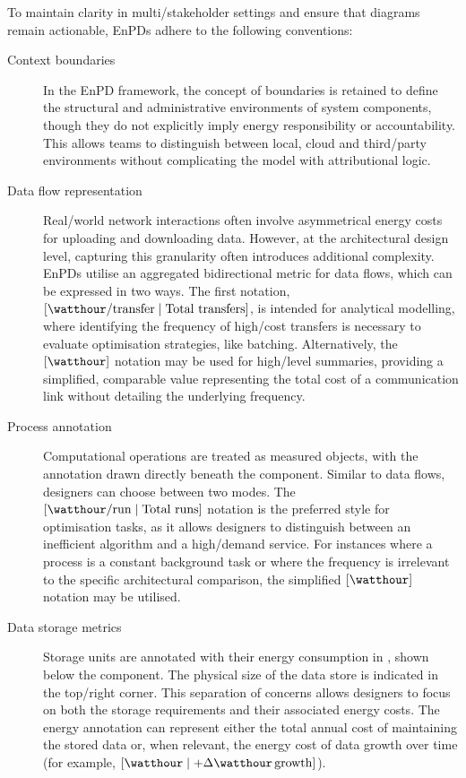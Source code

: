 \documentclass[11pt,a4paper]{article}
\begin{document}
To maintain clarity in multi\-/stakeholder settings and ensure that diagrams remain actionable, EnPDs adhere to the following conventions:
\begin{description}
  \item[Context boundaries] In the EnPD framework, the concept of boundaries is retained to define the structural and administrative environments of system components, though they do not explicitly imply energy responsibility or accountability.
  This allows teams to distinguish between local, cloud and third\-/party environments without complicating the model with attributional logic.
  \item[Data flow representation] Real\-/world network interactions often involve asymmetrical energy costs for uploading and downloading data.
  However, at the architectural design level, capturing this granularity often introduces additional complexity.
  EnPDs utilise an aggregated bidirectional metric for data flows, which can be expressed in two ways.
  The first notation, $[\si{\watthour\per transfer} \mid \text{Total transfers}]$, is intended for analytical modelling, where identifying the frequency of high\-/cost transfers is necessary to evaluate optimisation strategies, like batching.
  Alternatively, the $[\si{\watthour}]$ notation may be used for high\-/level summaries, providing a simplified, comparable value representing the total cost of a communication link without detailing the underlying frequency.
  \item[Process annotation] Computational operations are treated as measured objects, with the annotation drawn directly beneath the component.
  Similar to data flows, designers can choose between two modes.
  The $[\si{\watthour\per run} \mid \text{Total runs}]$ notation is the preferred style for optimisation tasks, as it allows designers to distinguish between an inefficient algorithm and a high\-/demand service.
  For instances where a process is a constant background task or where the frequency is irrelevant to the specific architectural comparison, the simplified $[\si{\watthour}]$ notation may be utilised.
  \item[Data storage metrics] Storage units are annotated with their energy consumption in \si{\watthour}, shown below the component.
  The physical size of the data store is indicated in the top\-/right corner.
  This separation of concerns allows designers to focus on both the storage requirements and their associated energy costs.
  The energy annotation can represent either the total annual cost of maintaining the stored data or, when relevant, the energy cost of data growth over time (for example, $[\si{\watthour} \mid + \Delta\si{\watthour}\,\text{growth}]$).

\end{description}
\end{document}
